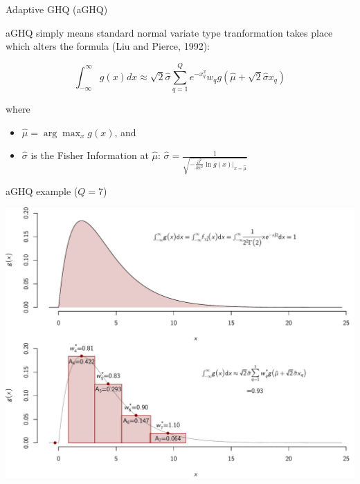 \documentclass{beamer}
\begin{document}
\begin{frame}{Adaptive GHQ (aGHQ)}


aGHQ simply means standard normal variate type tranformation takes place which alters the formula (Liu and Pierce, 1992):
\begin{block}\centering %
$$
\int_{-\infty}^\infty g\left( x \right) dx \approx
\sqrt{2} \hat{\sigma} \sum_{q=1}^{Q} e^{-x_q^2} w_q  g\left( \hat{\mu}+ \sqrt{2} \hat{\sigma}  x_q \right)
$$
\end{block}
where 
\begin{itemize}
\item $ \hat{\mu} = \arg\max_x g \left( x \right) $, and
\item $\hat{\sigma}$ is the Fisher Information at $ \hat{\mu}$:
$\hat{\sigma}=\frac{1}{\sqrt{-\frac{\partial^2}{\partial x^2} \ln g(x)\big|_{x=\hat{\mu}}  }  }$
\end{itemize}

\end{frame}




\begin{frame}{aGHQ example ($Q=7$)}

\begin{center} 
	\includegraphics[width=\textwidth]{fig/g-int-example.pdf}
\end{center}

\end{frame}
\end{document}

